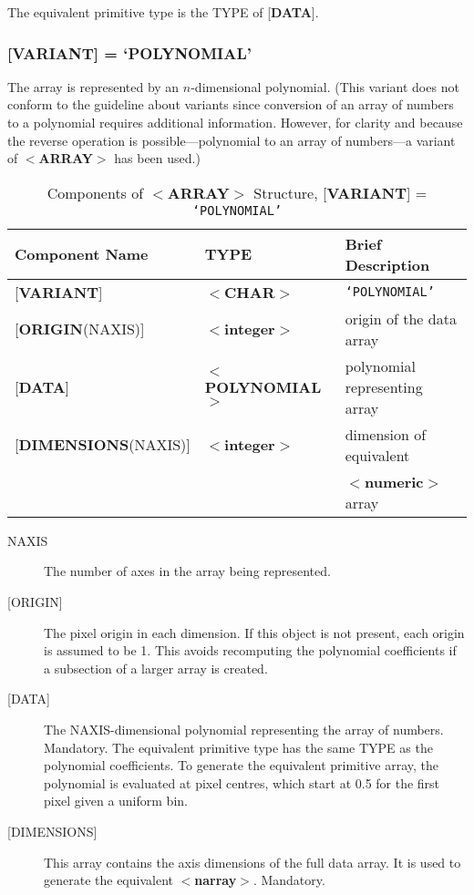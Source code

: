 \documentclass[twoside,11pt]{article}
\renewcommand{\_}{\texttt{\symbol{95}}}
\begin{document}
The equivalent primitive type is the TYPE of {[}{\bf DATA}{]}.

\subsubsection{{[}{\bf VARIANT}{]} = `POLYNOMIAL'}
The array is represented by an $n$-dimensional
polynomial.
(This variant does not conform to the
guideline about variants since conversion of an array of numbers to a
polynomial requires additional information.  However, for clarity and
because the reverse operation is possible---polynomial to an array of
numbers---a variant of $<${\bf ARRAY}$>$ has been used.)

\begin{table}[htb]
\centering
\caption{Components of $<${\bf ARRAY}$>$ Structure, {[}{\bf VARIANT}{]} = {\tt `POLYNOMIAL'}}
\begin{tabular}{|l|l|l|}
\hline
Component Name & TYPE & Brief Description \\ \hline
{[}{\bf VARIANT}{]} & $<${\bf \_CHAR}$>$ & {\tt `POLYNOMIAL'} \\
{[}{\bf ORIGIN}(NAXIS){]} & $<${\bf integer}$>$ & origin of the data array \\
{[}{\bf DATA}{]} & $<${\bf POLYNOMIAL}$>$ & polynomial representing array \\
{[}{\bf DIMENSIONS}(NAXIS){]} & $<${\bf integer}$>$ & dimension of equivalent \\
& & $<${\bf numeric}$>$ array \\ \hline
\end{tabular}
\end{table}

\begin{description}
\item [NAXIS]
The number of axes in the array being represented.
\item [{[}ORIGIN{]}]
The pixel origin in each dimension.  If this object is not present,
each origin is assumed to be 1.  This avoids recomputing the
polynomial coefficients if a subsection of a larger array is created.
\item [{[}DATA{]}]
The NAXIS-dimensional polynomial representing the array of numbers.
Mandatory.  The equivalent primitive type has the same TYPE as
the polynomial coefficients. To generate the equivalent primitive
array, the polynomial is evaluated at pixel centres, which start
at 0.5 for the first pixel given a uniform bin.
\item [{[}DIMENSIONS{]}]
This array contains the axis dimensions of the full data array.
It is used to generate the equivalent $<${\bf narray}$>$.
Mandatory.
\end{description}
\end{document}
